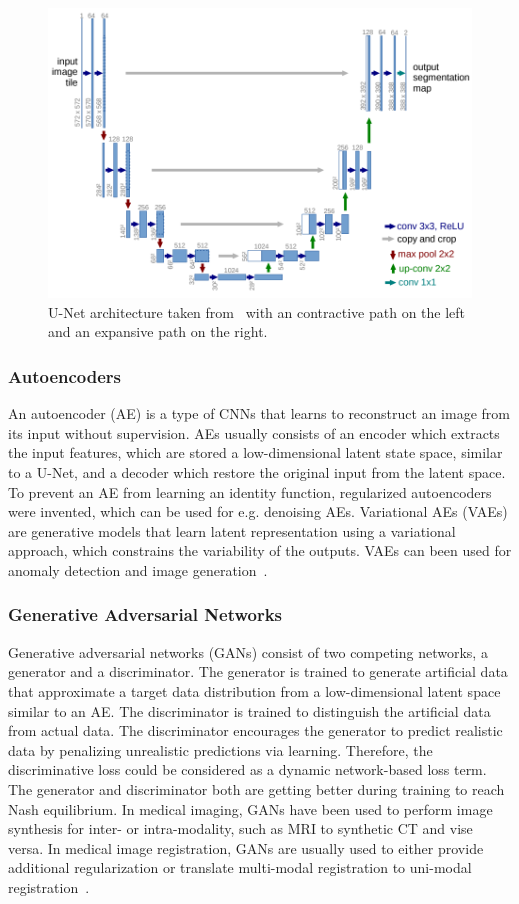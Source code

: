 \begin{figure}[h] %
	\centering
	\graphicspath{{images/}{\main/images/}}
	\includegraphics[width=.75\linewidth]{U-NetArchitecture.png} 
	\caption{U-Net architecture taken from~\cite{U-Net} with an contractive path on the left and an expansive path on the right.}
	\label{fig:U-NetArchitecture}
\end{figure}

\subsubsection{Autoencoders} \label{SubSubSec:Autoencoders}
An autoencoder (AE) is a type of CNNs that learns to reconstruct an image from its input without supervision. AEs usually consists of an encoder which extracts the input features, which are stored a low-dimensional latent state space, similar to a U-Net, and a decoder which restore the original input from the latent space. To prevent an AE from learning an identity function, regularized autoencoders were invented, which can be used for e.g. denoising AEs. Variational AEs (VAEs) are generative models that learn latent representation using a variational approach, which constrains the variability of the outputs. VAEs can been used for anomaly detection and image generation~\cite{Fu2020}.

\subsubsection{Generative Adversarial Networks} \label{SubSubSec:GANs}
Generative adversarial networks (GANs) consist of two competing networks, a generator and a discriminator. The generator is trained to generate artificial data that approximate a target data distribution from a low-dimensional latent space similar to an AE. The discriminator is trained to distinguish the artificial data from actual data. The discriminator encourages the generator to predict realistic data by penalizing unrealistic predictions via learning. Therefore, the discriminative loss could be considered as a dynamic network-based loss term. The generator and discriminator both are getting better during training to reach Nash equilibrium. In medical imaging, GANs have been used to perform image synthesis for inter- or intra-modality, such as MRI to synthetic CT and vise versa. In medical image registration, GANs are usually used to either provide additional regularization or translate multi-modal registration to uni-modal registration~\cite{Fu2020}.

